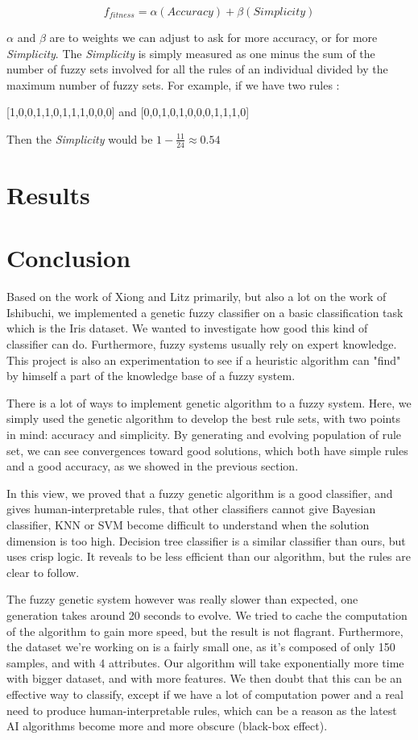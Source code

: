 \documentclass[a4paper,12pt]{article}
\begin{document}
\[f_{fitness}=\alpha (Accuracy)+\beta(Simplicity)\]

$\alpha$ and $\beta$ are to weights we can adjust to ask for more accuracy, or for more \textit{Simplicity}.
The \textit{Simplicity} is simply measured as one minus the sum of the number of fuzzy sets involved for all the rules of an individual divided by the maximum number of fuzzy sets. 
For example, if we have two rules :
\begin{center}[1,0,0,1,1,0,1,1,1,0,0,0] and [0,0,1,0,1,0,0,0,1,1,1,0]
\end{center}
Then the \textit{Simplicity} would be $1 - \frac{11}{24} \approx 0.54	$


\section{Results}


\section{Conclusion}

Based on the work of Xiong and Litz primarily, but also a lot on the work of Ishibuchi, we implemented a genetic fuzzy classifier on a basic classification task which is the Iris dataset.
We wanted to investigate how good this kind of classifier can do. Furthermore, fuzzy systems usually rely on expert knowledge. This project is also an experimentation to  see if a heuristic algorithm can "find" by himself a part of the knowledge base of a fuzzy system.

There is a lot of ways to implement genetic algorithm to a fuzzy system. Here, we simply used the genetic algorithm to develop the best rule sets, with two points in mind: accuracy and simplicity.
By generating and evolving population of rule set, we can see convergences toward good solutions, which both have simple rules and a good accuracy, as we showed in the previous section.

In this view, we proved that a fuzzy genetic algorithm is a good classifier, and gives human-interpretable rules, that other classifiers cannot give Bayesian classifier, KNN or SVM become difficult to understand when the solution dimension is too high.
Decision tree classifier is a similar classifier than ours, but uses crisp logic. It reveals to be less efficient than our algorithm, but the rules are clear to follow.

The fuzzy genetic system however was really slower than expected, one generation takes around 20 seconds to evolve. We tried to cache the computation of the algorithm to gain more speed, but the result is not flagrant. Furthermore, the dataset we're working on is a fairly small one, as it's composed of only 150 samples, and with 4 attributes. Our algorithm will take exponentially more time with bigger dataset, and with more features. We then doubt that this can be an effective way to classify, except if we have a lot of computation power and a real need to produce human-interpretable rules, which can be a reason as the latest AI algorithms become more and more obscure (black-box effect).
\end{document}
